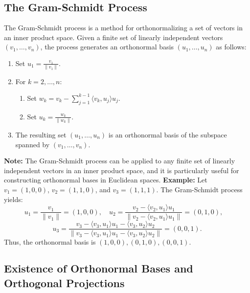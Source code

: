 \subsection{The Gram-Schmidt Process}
The Gram-Schmidt process is a method for orthonormalizing a set of vectors in an inner product space. Given a finite set of linearly independent vectors \( (v_1, \ldots, v_n) \), the process generates an orthonormal basis \( (u_1, \ldots, u_n) \) as follows:
\begin{enumerate}
    \item Set \( u_1 = \frac{v_1}{\|v_1\|} \).
    \item For \( k = 2, \ldots, n \):
    \begin{enumerate}
        \item Set \( w_k = v_k - \sum_{j=1}^{k-1} \langle v_k, u_j \rangle u_j \).
        \item Set \( u_k = \frac{w_k}{\|w_k\|} \).
    \end{enumerate}
    \item The resulting set \( (u_1, \ldots, u_n) \) is an orthonormal basis of the subspace spanned by \( (v_1, \ldots, v_n) \).
\end{enumerate}
\textbf{Note:} The Gram-Schmidt process can be applied to any finite set of linearly independent vectors in an inner product space, and it is particularly useful for constructing orthonormal bases in Euclidean spaces.
\textbf{Example:} Let \( v_1 = (1, 0, 0) \), \( v_2 = (1, 1, 0) \), and \( v_3 = (1, 1, 1) \). The Gram-Schmidt process yields:
\[
u_1 = \frac{v_1}{\|v_1\|} = (1, 0, 0), \quad
u_2 = \frac{v_2 - \langle v_2, u_1 \rangle u_1}{\|v_2 - \langle v_2, u_1 \rangle u_1\|} = \left(0, 1, 0\right), \quad
\]
\[
u_3 = \frac{v_3 - \langle v_3, u_1 \rangle u_1 - \langle v_3, u_2 \rangle u_2}{\|v_3 - \langle v_3, u_1 \rangle u_1 - \langle v_3, u_2 \rangle u_2\|} = \left(0, 0, 1\right).
\]
Thus, the orthonormal basis is \( (1, 0, 0), (0, 1, 0), (0, 0, 1) \).

\subsection{Existence of Orthonormal Bases and Orthogonal Projections}

